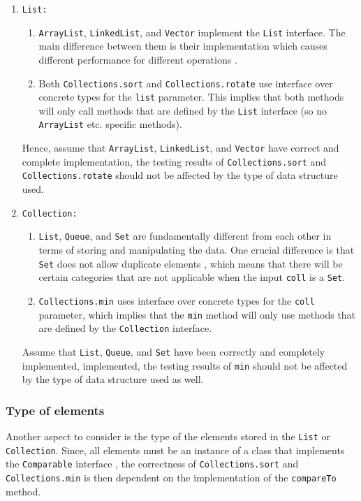 \documentclass[12pt, a4paper]{article}
\begin{document}
\begin{enumerate}
  \item \texttt{List:}
  \begin{enumerate}
    \item \texttt{ArrayList}, \texttt{LinkedList}, and \texttt{Vector} implement the \texttt{List}
    interface. The main difference between them is their implementation which causes different
    performance for different operations \cite{arraylist, linkedlist, vector}.
    \item Both \texttt{Collections.sort} and \texttt{Collections.rotate} use interface over
    concrete types for the \texttt{list} parameter. This implies that both methods will only call
    methods that are defined by the \texttt{List} interface (so no \texttt{ArrayList} etc. specific
    methods).
  \end{enumerate}
  Hence, assume that \texttt{ArrayList}, \texttt{LinkedList}, and \texttt{Vector} have correct and
  complete implementation, the testing results of \texttt{Collections.sort} and
  \texttt{Collections.rotate} should not be affected by the type of data structure used.

  \item \texttt{Collection:}
  \begin{enumerate}
    \item \texttt{List}, \texttt{Queue}, and \texttt{Set} are fundamentally different from each
    other in terms of storing and manipulating the data. One crucial difference is that \texttt{Set}
    does not allow duplicate elements \cite{set}, which means that there will be certain categories
    that are not applicable when the input \texttt{coll} is a \texttt{Set}.
    \item \texttt{Collections.min} uses interface over concrete types for the \texttt{coll}
    parameter, which implies that the \texttt{min} method will only use methods that are defined by
    the \texttt{Collection} interface.
  \end{enumerate}
  Assume that \texttt{List}, \texttt{Queue}, and \texttt{Set} have been correctly and completely
  implemented, implemented, the testing results of \texttt{min} should not be affected by the type
  of data structure used as well.
\end{enumerate}

\subsubsection{Type of elements}
Another aspect to consider is the type of the elements stored in the \texttt{List} or
\texttt{Collection}. Since, all elements must be an instance of a class that implements the
\texttt{Comparable} interface \cite{comparable}, the correctness of \texttt{Collections.sort} and
\texttt{Collections.min} is then dependent on the implementation of the \texttt{compareTo} method.
\end{document}
